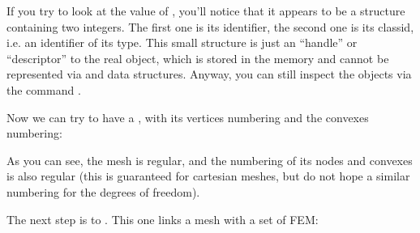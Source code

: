 \documentclass[a4paper,11pt,english]{sphinxmanual}
\begin{document}
If you try to look at the value of , you’ll notice that it appears to be a
structure containing two integers. The first one is its identifier, the second one
is its class\sphinxhyphen{}id, i.e. an identifier of its type. This small structure is just an
“handle” or “descriptor” to the real object, which is stored in the  memory
and cannot be represented via  and  data structures. Anyway, you can still inspect the  objects via the command .

Now we can try to have a , with its vertices numbering and the
convexes numbering:

\begin{sphinxVerbatim}[commandchars=\\\{\}]
 
     
\end{sphinxVerbatim}

As you can see, the mesh is regular, and the numbering of its nodes and convexes
is also regular (this is guaranteed for cartesian meshes, but do not hope a
similar numbering for the degrees of freedom).

The next step is to . This one links a mesh with a set
of FEM:

\begin{sphinxVerbatim}[commandchars=\\\{\}]
 
   
 
\end{sphinxVerbatim}
\end{document}
